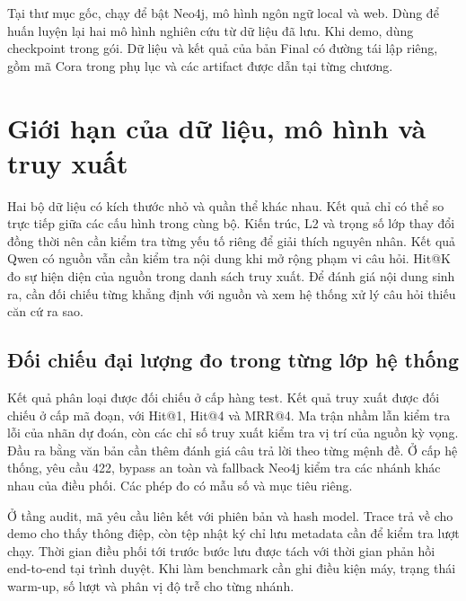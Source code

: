 

Tại thư mục gốc, chạy  để bật Neo4j, mô hình ngôn ngữ local và web. Dùng  để huấn luyện lại hai mô hình nghiên cứu từ dữ liệu đã lưu. Khi demo, dùng checkpoint trong gói. Dữ liệu và kết quả của bản Final có đường tái lập riêng, gồm mã Cora trong phụ lục và các artifact được dẫn tại từng chương.

\section{Giới hạn của dữ liệu, mô hình và truy xuất}
Hai bộ dữ liệu có kích thước nhỏ và quần thể khác nhau. Kết quả chỉ có thể so trực tiếp giữa các cấu hình trong cùng bộ. Kiến trúc, L2 và trọng số lớp thay đổi đồng thời nên cần kiểm tra từng yếu tố riêng để giải thích nguyên nhân. Kết quả Qwen có nguồn vẫn cần kiểm tra nội dung khi mở rộng phạm vi câu hỏi. Hit@K đo sự hiện diện của nguồn trong danh sách truy xuất. Để đánh giá nội dung sinh ra, cần đối chiếu từng khẳng định với nguồn và xem hệ thống xử lý câu hỏi thiếu căn cứ ra sao.

\subsection{Đối chiếu đại lượng đo trong từng lớp hệ thống}
Kết quả phân loại được đối chiếu ở cấp hàng test. Kết quả truy xuất được đối chiếu ở cấp mã đoạn, với Hit@1, Hit@4 và MRR@4. Ma trận nhầm lẫn kiểm tra lỗi của nhãn dự đoán, còn các chỉ số truy xuất kiểm tra vị trí của nguồn kỳ vọng. Đầu ra bằng văn bản cần thêm đánh giá câu trả lời theo từng mệnh đề. Ở cấp hệ thống, yêu cầu 422, bypass an toàn và fallback Neo4j kiểm tra các nhánh khác nhau của điều phối. Các phép đo có mẫu số và mục tiêu riêng.

Ở tầng audit, mã yêu cầu liên kết với phiên bản và hash model. Trace trả về cho demo cho thấy thông điệp, còn tệp nhật ký chỉ lưu metadata cần để kiểm tra lượt chạy. Thời gian điều phối tới trước bước lưu được tách với thời gian phản hồi end-to-end tại trình duyệt. Khi làm benchmark cần ghi điều kiện máy, trạng thái warm-up, số lượt và phân vị độ trễ cho từng nhánh.

